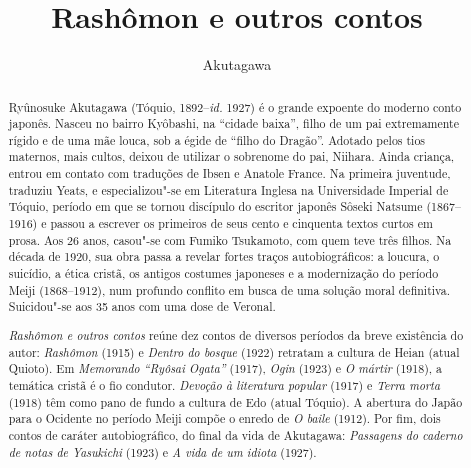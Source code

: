 \documentclass[12pt]{extarticle}
\begin{document}
\newcommand{\AutorLivro}{Akutagawa}
\newcommand{\TituloLivro}{Rashômon e outros contos}
\newcommand{\Tema}{Ficção, mistério e fantasia}
\newcommand{\Genero}{Conto, crônica e novela}
\newcommand{\imagemCapa}{./images/PNLD0009-01.png}
\newcommand{\issnppub}{978-65-86238-32-7}
\newcommand{\issnepub}{978-65-86238-33-4}
\newcommand{\colaborador}{{Cesar Augusto Araujo Oyakawa, Bruno Gradella e Vicente Castro}}


\title{\TituloLivro}
\author{\AutorLivro}
\def\authornotes{\colaborador}

\date{}
\maketitle

\baselineskip\par

\begin{abstract}

Ryûnosuke Akutagawa (Tóquio, 1892--\textit{id.} 1927) é o grande
  expoente do moderno conto japonês. Nasceu no bairro Kyôbashi, na ``cidade
  baixa'', filho de um pai extremamente rígido e de uma mãe louca, sob a égide
  de ``filho do Dragão''. Adotado pelos tios maternos, mais cultos, deixou de
  utilizar o sobrenome do pai, Niihara. Ainda criança, entrou em contato com
  traduções de Ibsen e Anatole France. Na primeira juventude, traduziu Yeats, e
  especializou"-se em Literatura Inglesa na Universidade Imperial de Tóquio,
  período em que se tornou discípulo do escritor japonês Sôseki Natsume
  (1867--1916) e passou a escrever os primeiros de seus cento e cinquenta
  textos curtos em prosa. Aos 26 anos, casou"-se com Fumiko Tsukamoto, com quem
  teve três filhos.  Na década de 1920, sua obra passa a revelar fortes traços
  autobiográficos: a loucura, o suicídio, a ética cristã, os antigos costumes
  japoneses e a modernização do período Meiji (1868--1912), num profundo
  conflito em busca de uma solução moral definitiva.  Suicidou"-se aos 35 anos
  com uma dose de Veronal. 
        
\textit{Rashômon e outros contos} reúne dez contos de diversos períodos da
  breve existência do autor: \textit{Rashômon} (1915) e \textit{Dentro do
  bosque} (1922) retratam a cultura de Heian (atual Quioto). Em
  \textit{Memorando ``Ryôsai Ogata''} (1917), \textit{Ogin} (1923) e \textit{O
  mártir} (1918), a temática cristã é o fio condutor.  \textit{Devoção à
  literatura popular} (1917) e \textit{Terra morta} (1918) têm como pano de
  fundo a cultura de Edo (atual Tóquio). A abertura do Japão para o Ocidente no
  período Meiji compõe o enredo de \textit{O baile} (1912). Por fim, dois
  contos de caráter autobiográfico, do final da vida de Akutagawa:
  \textit{Passagens do caderno de notas de Yasukichi} (1923) e \textit{A vida
de um idiota} (1927).      \end{abstract}
\end{document}
